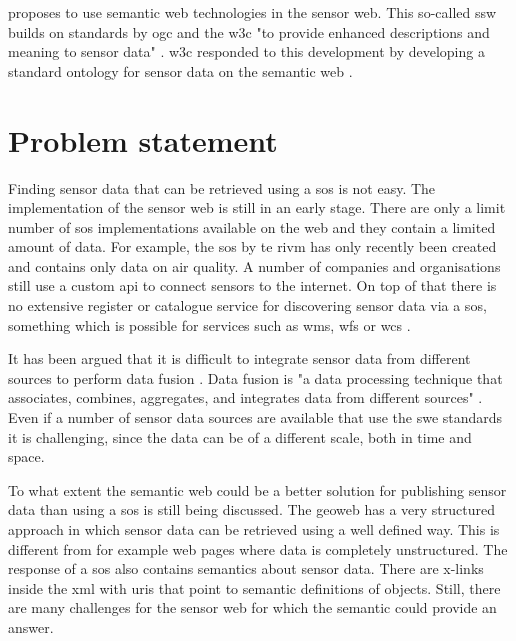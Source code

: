 \cite{SSW:Sheth} proposes to use semantic web technologies in the sensor web. This so-called \ac{ssw} builds on standards by \ac{ogc} and the \ac{w3c} "to provide enhanced descriptions and meaning to sensor data" \cite[p.78]{SSW:Sheth}. \ac{w3c} responded to this development by developing a standard ontology for sensor data on the semantic web \citep{SSW:SSN_incubatorGroup}. 
 
\section{Problem statement}
Finding sensor data that can be retrieved using a \ac{sos} is not easy. The implementation of the sensor web is still in an early stage. There are only a limit number of \ac{sos} implementations available on the web and they contain a limited amount of data. For example, the \ac{sos} by te \ac{rivm} has only recently been created and contains only data on air quality. A number of companies and organisations still use a custom \ac{api} to connect sensors to the internet. On top of that there is no extensive register or catalogue service for discovering sensor data via a \ac{sos}, something which is possible for services such as \ac{wms}, \ac{wfs} or \ac{wcs} \citep{SDI:OGC2}.

It has been argued that it is difficult to integrate sensor data from different sources to perform data fusion \citep{SSW:Corcho, SSW:Ji, SSW:Wang}. Data fusion is "a data processing technique that associates, combines, aggregates, and integrates data from different sources" \cite[p. 2]{SSW:Wang2}. Even if a number of sensor data sources are available that use the \ac{swe} standards it is challenging, since the data can be of a different scale, both in time and space. 

To what extent the semantic web could be a better solution for publishing sensor data than using a \ac{sos} is still being discussed. The geoweb has a very structured approach in which sensor data can be retrieved using a well defined way. This is different from for example web pages where data is completely unstructured. The response of a \ac{sos} also contains semantics about sensor data. There are x-links inside the \ac{xml} with \ac{uri}s that point to semantic definitions of objects. Still, there are many challenges for the sensor web for which the semantic could provide an answer.   

